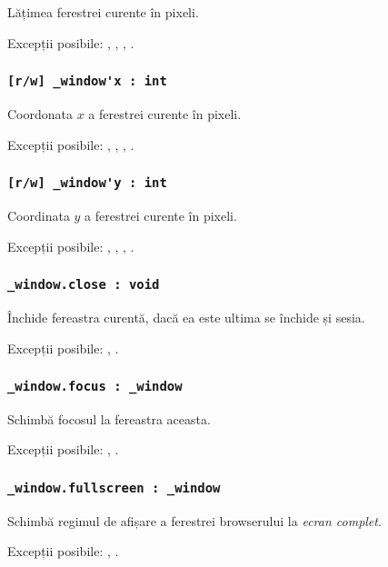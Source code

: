 Lățimea ferestrei curente în pixeli.

Excepții posibile: , , , .

\subsubsection{\lstinline|[r/w] _window'x : int|}

Coordonata $x$ a ferestrei curente în pixeli.

Excepții posibile: , , , .

\subsubsection{\lstinline|[r/w] _window'y : int|}

Coordinata $y$ a ferestrei curente în pixeli.

Excepții posibile: , , , .

\subsubsection{\lstinline|_window.close : void|}

Închide fereastra curentă, dacă ea este ultima se închide și sesia.

Excepții posibile: , .

\subsubsection{\lstinline|_window.focus : _window|}

Schimbă focosul la fereastra aceasta.

Excepții posibile: , .

\subsubsection{\lstinline|_window.fullscreen : _window|}

Schimbă regimul de afișare a ferestrei browserului la \textit{ecran complet}.

Excepții posibile: , .

